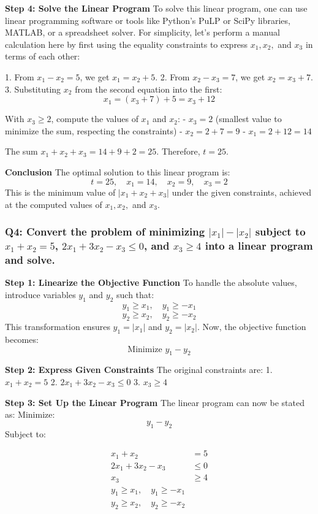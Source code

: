 \documentclass[8pt]{article}
\begin{document}
\textbf{Step 4: Solve the Linear Program}
To solve this linear program, one can use linear programming software or tools like Python’s PuLP or SciPy libraries, MATLAB, or a spreadsheet solver. For simplicity, let’s perform a manual calculation here by first using the equality constraints to express \( x_1, x_2, \) and \( x_3 \) in terms of each other:

1. From \( x_1 - x_2 = 5 \), we get \( x_1 = x_2 + 5 \).
2. From \( x_2 - x_3 = 7 \), we get \( x_2 = x_3 + 7 \).
3. Substituting \( x_2 \) from the second equation into the first:
   \[
   x_1 = (x_3 + 7) + 5 = x_3 + 12
   \]

With \( x_3 \geq 2 \), compute the values of \( x_1 \) and \( x_2 \):
- \( x_3 = 2 \) (smallest value to minimize the sum, respecting the constraints)
- \( x_2 = 2 + 7 = 9 \)
- \( x_1 = 2 + 12 = 14 \)

The sum \( x_1 + x_2 + x_3 = 14 + 9 + 2 = 25 \). Therefore, \( t = 25 \).

\textbf{Conclusion}
The optimal solution to this linear program is:
\[
t = 25, \quad x_1 = 14, \quad x_2 = 9, \quad x_3 = 2
\]
This is the minimum value of \( |x_1 + x_2 + x_3| \) under the given constraints, achieved at the computed values of \( x_1, x_2, \) and \( x_3 \).

\subsubsection*{Q4: Convert the problem of minimizing \(|x_1| - |x_2|\) subject to \(x_1 + x_2 = 5\), \(2x_1 + 3x_2 - x_3 \leq 0\), and \(x_3 \geq 4\) into a linear program and solve.}

\textbf{Step 1: Linearize the Objective Function}
To handle the absolute values, introduce variables \( y_1 \) and \( y_2 \) such that:
\[
y_1 \geq x_1, \quad y_1 \geq -x_1
\]
\[
y_2 \geq x_2, \quad y_2 \geq -x_2
\]
This transformation ensures \( y_1 = |x_1| \) and \( y_2 = |x_2| \). Now, the objective function becomes:
\[
\text{Minimize } y_1 - y_2
\]

\textbf{Step 2: Express Given Constraints}
The original constraints are:
1. \( x_1 + x_2 = 5 \)
2. \( 2x_1 + 3x_2 - x_3 \leq 0 \)
3. \( x_3 \geq 4 \)

\textbf{Step 3: Set Up the Linear Program}
The linear program can now be stated as:
Minimize:
\[
y_1 - y_2
\]
Subject to:

\begin{align*}
x_1 + x_2 &= 5 \\
2x_1 + 3x_2 - x_3 &\leq 0 \\
x_3 &\geq 4 \\
y_1 \geq x_1, \quad y_1 \geq -x_1 \\
y_2 \geq x_2, \quad y_2 \geq -x_2 \\
\end{align*}
\end{document}
